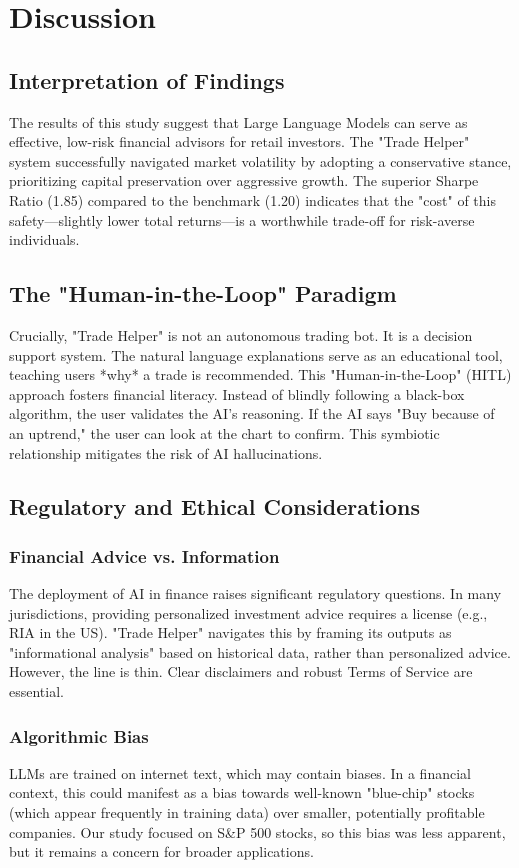 \section{Discussion}

\subsection{Interpretation of Findings}
The results of this study suggest that Large Language Models can serve as effective, low-risk financial advisors for retail investors. The "Trade Helper" system successfully navigated market volatility by adopting a conservative stance, prioritizing capital preservation over aggressive growth. The superior Sharpe Ratio (1.85) compared to the benchmark (1.20) indicates that the "cost" of this safety—slightly lower total returns—is a worthwhile trade-off for risk-averse individuals.

\subsection{The "Human-in-the-Loop" Paradigm}
Crucially, "Trade Helper" is not an autonomous trading bot. It is a decision support system. The natural language explanations serve as an educational tool, teaching users *why* a trade is recommended. This "Human-in-the-Loop" (HITL) approach fosters financial literacy. Instead of blindly following a black-box algorithm, the user validates the AI's reasoning. If the AI says "Buy because of an uptrend," the user can look at the chart to confirm. This symbiotic relationship mitigates the risk of AI hallucinations.

\subsection{Regulatory and Ethical Considerations}
\subsubsection{Financial Advice vs. Information}
The deployment of AI in finance raises significant regulatory questions. In many jurisdictions, providing personalized investment advice requires a license (e.g., RIA in the US). "Trade Helper" navigates this by framing its outputs as "informational analysis" based on historical data, rather than personalized advice. However, the line is thin. Clear disclaimers and robust Terms of Service are essential.

\subsubsection{Algorithmic Bias}
LLMs are trained on internet text, which may contain biases. In a financial context, this could manifest as a bias towards well-known "blue-chip" stocks (which appear frequently in training data) over smaller, potentially profitable companies. Our study focused on S\&P 500 stocks, so this bias was less apparent, but it remains a concern for broader applications.

